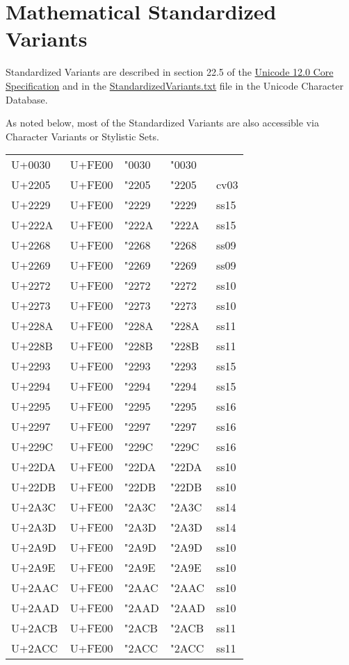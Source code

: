 \clearpage

\section{Mathematical Standardized Variants}

Standardized Variants are described in section 22.5 of the
\href{https://www.unicode.org/versions/Unicode12.0.0/ch22.pdf#G23168}{Unicode
12.0 Core Specification} and in the
\href{https://www.unicode.org/Public/12.0.0/ucd/StandardizedVariants.txt}{StandardizedVariants.txt}
file in the Unicode Character Database.

As noted below, most of the Standardized Variants are also accessible
via Character Variants or Stylistic Sets.

\medskip


\begingroup

\def\arraystretch{1.2}

\newcommand{\variant}[2][]{U+#2&U+FE00 &\stixmath\char"#2&\stixmath\char"#2︀&#1\\}

\begin{tabular}{@{}l@{\,}ll@{${}\to{}$}l@{\qquad}l@{}}
\variant{0030}%
\variant[cv03]{2205}%
\variant[ss15]{2229}%
\variant[ss15]{222A}%
\variant[ss09]{2268}%
\variant[ss09]{2269}%
\variant[ss10]{2272}%
\variant[ss10]{2273}%
\variant[ss11]{228A}%
\variant[ss11]{228B}%
\variant[ss15]{2293}%
\variant[ss15]{2294}%

\variant[ss16]{2295}%
\variant[ss16]{2297}%
\variant[ss16]{229C}%

\variant[ss10]{22DA}%
\variant[ss10]{22DB}%
\variant[ss14]{2A3C}%
\variant[ss14]{2A3D}%
\variant[ss10]{2A9D}%
\variant[ss10]{2A9E}%
\variant[ss10]{2AAC}%
\variant[ss10]{2AAD}%
\variant[ss11]{2ACB}%
\variant[ss11]{2ACC}%
\end{tabular}

\endgroup

\endgroup

\endinput

